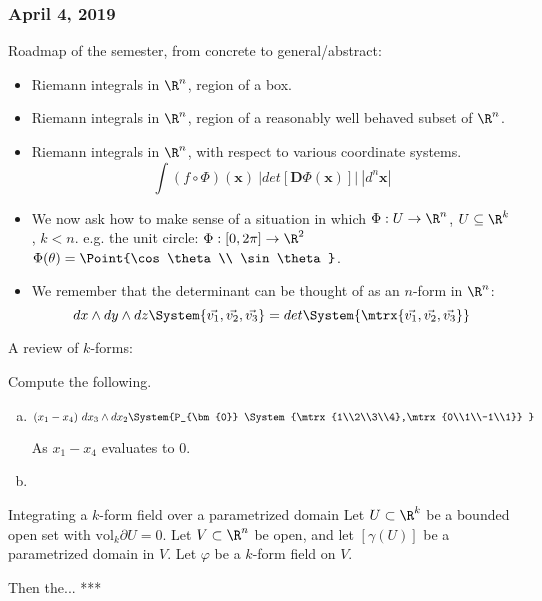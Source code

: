 \subsubsection*{April 4, 2019}

Roadmap of the semester, from concrete to general/abstract: 
\begin{itemize}
	\item Riemann integrals in $\R^n$, region of a box. 
	\item Riemann integrals in $\R^n$, region of a reasonably well behaved subset of $\R^n$.
	\item Riemann integrals in $\R^n$, with respect to various coordinate systems.
	\[\int (f\circ \Phi)(\bm{x})\ \big|det[\bm{D}\Phi (\bm{x})]\big|\ \left|d^n \bm{x}\right|\]
	\item We now ask how to make sense of a situation in which $\Phi : U \to \R^n$, $U\subseteq \R^k$, $k<n$. e.g. the unit circle: $\Phi : [0,2\pi] \to \R^2$ $\Phi(\theta) = \Point{\cos\theta \\ \sin\theta}$. 
	\item We remember that the determinant can be thought of as an $n$-form in $\R^n$: 
	\[dx\land dy\land dz \System{\vec{v_1},\vec{v_2},\vec{v_3}} = det\System{\mtrx{\vec{v_1},\vec{v_2},\vec{v_3}}} \]
\end{itemize}

A review of $k$-forms: 

 Compute the following. 
\begin{enumerate}[a.]
	\item $(x_1-x_4)\ dx_3 \land dx_2 \System{P_{\bm{0}} \System{\mtrx{1\\2\\3\\4},\mtrx{0\\1\\-1\\1}} }$
	
	 As $x_1-x_4$ evaluates to 0. 
	
	\item 
\end{enumerate}

\begin{defn}{Integrating a $k$-form field over a parametrized domain}
	Let $U\subset \R^k$ be a bounded open set with $\mathrm{vol}_k \partial U = 0$. Let $V\subset \R^n$ be open, and let $[\gamma(U)]$ be a parametrized domain in $V$. Let $\varphi$ be a $k$-form field on $V$. 
	
	Then the... ***
\end{defn}

